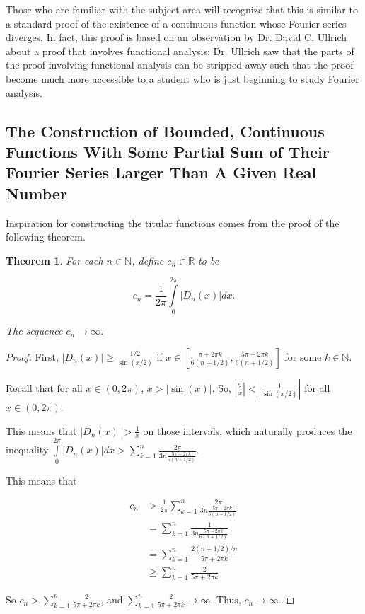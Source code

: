 \documentclass{amsart}
\newcommand{\N}{\mathbb{N}}
\newcommand{\R}{\mathbb{R}}
\newcommand{\absval}[1]{\left| #1 \right|}
\newtheorem{thm}{Theorem}[section]
\theoremstyle{definition}
\begin{document}
Those who are familiar with the subject area will recognize that this is similar to a standard proof of the existence of a continuous function whose Fourier series diverges. 
In fact, this proof is based on an observation by Dr. David C. Ullrich about a proof that involves functional analysis; 
Dr. Ullrich saw that the parts of the proof involving functional analysis can be stripped away such that the proof become much more accessible to a student who is just beginning to study Fourier analysis.

\subsection{The Construction of Bounded, Continuous Functions With Some Partial Sum of Their Fourier Series Larger Than A Given Real Number}\hspace*{\fill}

Inspiration for constructing the titular functions comes from the proof of the following theorem.

\begin{thm}
For each $n \in \N$, define $c_n \in \R$ to be

\begin{displaymath}
c_n = \frac{1}{2 \pi} \int\limits_0^{2\pi} \absval{D_n(x)} dx.
\end{displaymath}

The sequence $c_n \to \infty$.
\end{thm}

\begin{proof}

First, $\absval{D_n(x)} \geq \frac{1/2}{\sin(x/2)}$ if $x \in [\frac{\pi +2\pi k}{6(n+1/2)},\frac{5 \pi+2\pi k}{6(n+1/2)}]$ for some $k \in \N$.

Recall that for all $x \in (0, 2\pi)$, $x > \absval{\sin(x)}$. 
So, $\absval{\frac{2}{x}} < \absval{\frac{1}{\sin(x/2)}}$ for all $x \in (0,2\pi)$.

This means that $\absval{D_n(x)} > \frac{1}{x}$ on those intervals, which naturally produces the inequality $\int\limits_0^{2\pi} \absval{D_n(x)} dx > \sum\limits_{k=1}^n \frac{2 \pi}{3n \frac{5\pi + 2\pi k}{6(n+1/2)}}$. 

This means that 

\begin{align*}
c_n &> \frac{1}{2 \pi} \sum\limits_{k=1}^n \frac{2 \pi}{3n \frac{5 \pi+2\pi k}{6(n+1/2)}}\\
&= \sum\limits_{k=1}^n \frac{1}{3n \frac{5 \pi+2\pi k}{6(n+1/2)}}\\
&= \sum\limits_{k=1}^n \frac{2(n+1/2)/{n}}{5 \pi+2\pi k}\\
&\geq \sum\limits_{k=1}^n \frac{2}{5 \pi+2\pi k}
\end{align*}

So $c_n > \sum\limits_{k=1}^n \frac{2}{5 \pi+2\pi k}$, and $\sum\limits_{k=1}^n \frac{2}{5 \pi+2\pi k} \to \infty$. 
Thus, $c_n \to \infty$.

\end{proof}
\end{document}
